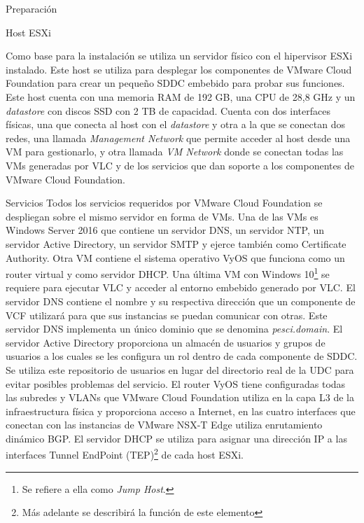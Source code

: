 \begin{subsection}{Preparación}
    \begin{subsubsection}{Host ESXi}  
    
    Como base para la instalación se utiliza un servidor físico con el hipervisor ESXi instalado. Este host se utiliza para desplegar los componentes de VMware Cloud Foundation para crear un pequeño SDDC embebido para probar sus funciones. Este host cuenta con una memoria RAM de 192 GB, una CPU de 28,8 GHz y un \textit{datastore} con discos SSD con 2 TB de capacidad. Cuenta con dos interfaces físicas, una que conecta al host con el \textit{datastore} y otra a la que se conectan dos redes, una llamada \textit{Management Network} que permite acceder al host desde una VM para gestionarlo, y otra llamada \textit{VM Network} donde se conectan todas las VMs generadas por VLC y de los servicios que dan soporte a los componentes de VMware Cloud Foundation.
    \end{subsubsection}
    \begin{subsubsection}{Servicios}
      Todos los servicios requeridos por VMware Cloud Foundation se despliegan sobre el mismo servidor en forma de VMs. Una de las VMs es Windows Server 2016 que contiene un servidor DNS, un servidor NTP, un servidor Active Directory, un servidor SMTP y ejerce también como Certificate Authority. Otra VM contiene el sistema operativo VyOS que funciona como un router virtual y como servidor DHCP. Una última VM con Windows 10\footnote{Se refiere a ella como \textit{Jump Host}.} se requiere para ejecutar VLC y acceder al entorno embebido generado por VLC.
      El servidor DNS contiene el nombre y su respectiva dirección que un componente de VCF utilizará para que sus instancias se puedan comunicar con otras. Este servidor DNS implementa un único dominio que se denomina \textit{pesci.domain}. El servidor Active Directory proporciona un almacén de usuarios y grupos de usuarios a los cuales se les configura un rol dentro de cada componente de SDDC. Se utiliza este repositorio de usuarios en lugar del directorio real de la UDC para evitar posibles problemas del servicio. El router VyOS tiene configuradas todas las subredes y VLANs que VMware Cloud Foundation utiliza en la capa L3 de la infraestructura física y proporciona acceso a Internet, en las cuatro interfaces que conectan con las instancias de VMware NSX-T Edge utiliza enrutamiento dinámico BGP. El servidor DHCP se utiliza para asignar una dirección IP a las interfaces Tunnel EndPoint (TEP)\footnote{Más adelante se describirá la función de este elemento} de cada host ESXi.    
    \end{subsubsection}
    

\end{subsection}
